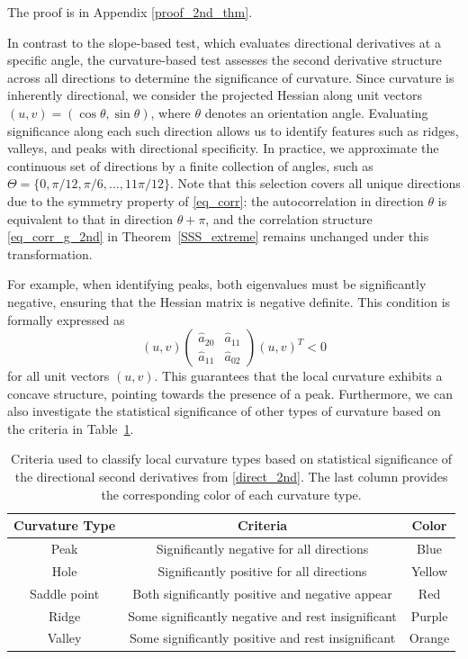 \documentclass{article}
\def\ha{\hat{a}}
\begin{document}
The proof is in Appendix \ref{proof_2nd_thm}.

In contrast to the slope-based test, which evaluates directional derivatives at a specific angle, the curvature-based test assesses the second derivative structure across all directions to determine the significance of curvature.
Since curvature is inherently directional, we consider the projected Hessian along unit vectors $(u, v) = (\cos\theta, \sin\theta)$, where $\theta$ denotes an orientation angle. Evaluating significance along each such direction allows us to identify features such as ridges, valleys, and peaks with directional specificity.
In practice, we approximate the continuous set of directions by a finite collection of angles, such as $\Theta = \{0, \pi/12, \pi/6, \ldots, 11\pi/12\}$. Note that this selection covers all unique directions due to the symmetry property of \eqref{eq_corr}: the autocorrelation in direction $\theta$ is equivalent to that in direction $\theta + \pi$, and the correlation structure \eqref{eq_corr_g_2nd} in Theorem~\ref{SSS_extreme} remains unchanged under this transformation.

For example, when identifying peaks, both eigenvalues must be significantly negative, ensuring that the Hessian matrix is negative definite. This condition is formally expressed as
\begin{equation*}
	\label{eq_direct_curve}
	(u,v) \begin{pmatrix}
		\ha_{20} & \ha_{11} \\
		\ha_{11} & \ha_{02}
	\end{pmatrix} (u,v)^T < 0
\end{equation*}  
for all unit vectors \((u,v)\). This guarantees that the local curvature exhibits a concave structure, pointing towards the presence of a peak. 
Furthermore, we can also investigate the statistical significance of other types of curvature based on the criteria in Table~\ref{Table_curve_standard}. 
\begin{table}[htbp]
	\centering
	\caption{Criteria used to classify local curvature types based on statistical significance of the directional second derivatives from  \eqref{direct_2nd}. The last column provides the corresponding color of each curvature type.}
	\label{Table_curve_standard}
	\begin{tabular}{|c|c|c|}
		\hline
		Curvature Type &Criteria &Color    \\
		\hline
		Peak&Significantly negative for all directions& Blue\\
		\hline
		Hole&Significantly positive for all directions& Yellow\\
		\hline
		Saddle point&Both significantly positive and negative appear& Red  \\
		\hline
		Ridge&Some significantly negative and rest insignificant& Purple\\
		\hline
		Valley&Some significantly positive and rest insignificant& Orange\\
		\hline
	\end{tabular}
\end{table}
\end{document}
